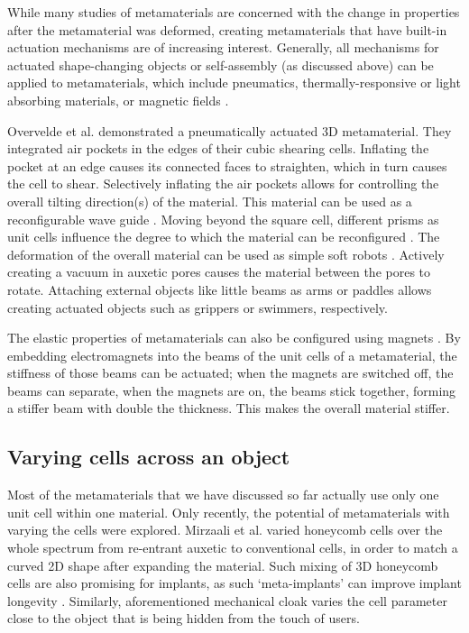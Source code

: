 {While many studies of metamaterials are concerned with the change in properties after the metamaterial was deformed, creating metamaterials that have built-in actuation mechanisms are of increasing interest. Generally, all mechanisms for actuated shape-changing objects or self-assembly (as discussed above) can be applied to metamaterials, which include pneumatics, thermally-responsive or light absorbing materials, or magnetic fields \cite{Geryak2014}. 

Overvelde et al. \cite{Overvelde2016a} demonstrated a pneumatically actuated 3D metamaterial. They integrated air pockets in the edges of their cubic shearing cells. Inflating the pocket at an edge causes its connected faces to straighten, which in turn causes the cell to shear. Selectively inflating the air pockets allows for controlling the overall tilting direction(s) of the material. This material can be used as a reconfigurable wave guide \cite{Babaee2016}. Moving beyond the square cell, different prisms as unit cells influence the degree to which the material can be reconfigured \cite{Overvelde2017}. The deformation of the overall material can be used as simple soft robots \cite{Yang2015}. Actively creating a vacuum in auxetic pores causes the material between the pores to rotate. Attaching external objects like little beams as arms or paddles allows creating actuated objects such as grippers or swimmers, respectively.

The elastic properties of metamaterials can also be configured using magnets \cite{Haghpanah2016a}. By embedding electromagnets into the beams of the unit cells of a metamaterial, the stiffness of those beams can be actuated; when the magnets are switched off, the beams can separate, when the magnets are on, the beams stick together, forming a stiffer beam with double the thickness. This makes the overall material stiffer. 



\subsection{Varying cells across an object}

Most of the metamaterials that we have discussed so far actually use only one unit cell within one material. Only recently, the potential of metamaterials with varying the cells were explored. Mirzaali et al. \cite{Mirzaali2018} varied honeycomb cells over the whole spectrum from re-entrant auxetic to conventional cells, in order to match a curved 2D shape after expanding the material. Such mixing of 3D honeycomb cells are also promising for implants, as such `meta-implants' can improve implant longevity \cite{Kolken2018}. Similarly, aforementioned mechanical cloak \cite{Buckmann2014, Buckmann2015a}  varies the cell parameter close to the object that is being hidden from the touch of users. %

}
